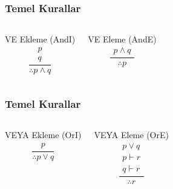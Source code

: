 \documentclass[dvipsnames]{beamer}
\theoremstyle{definition}
\theoremstyle{example}
\theoremstyle{plain}
\begin{document}
\begin{frame}
  \frametitle{Temel Kurallar}

  \begin{columns}[t]
    \begin{block}{VE Ekleme (AndI)}
      \[
      \frac
        {
          \begin{array}{c}
            p\\
            q
          \end{array}
        }
        {
          \therefore p \wedge q
        }
      \]
    \end{block}

    \pause
    \begin{block}{VE Eleme (AndE)}
    \[
    \frac
      {
        \begin{array}{c}
          p \wedge q
        \end{array}
      }
      {
        \therefore p
      }
    \]
    \end{block}
  \end{columns}
\end{frame}

\begin{frame}
  \frametitle{Temel Kurallar}

  \begin{columns}[t]
    \begin{block}{VEYA Ekleme (OrI)}
      \[
      \frac
        {
          \begin{array}{c}
            p
          \end{array}
        }
        {
          \therefore p \vee q
        }
      \]
    \end{block}

    \pause
    \begin{block}{VEYA Eleme (OrE)}
    \[
    \frac
      {
        \begin{array}{c}
          p \vee q\\
          p \vdash r\\
          q \vdash r
        \end{array}
      }
      {
        \therefore r
      }
    \]
    \end{block}
  \end{columns}
\end{frame}
\end{document}

